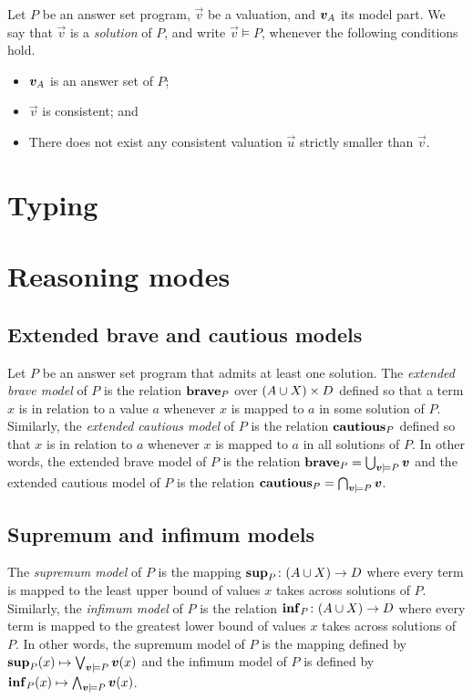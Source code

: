 Let $P$ be an answer set program, $\vec{v}$ be a valuation, and ${\bm{v}}_{A}$ its model part.
We say that $\vec{v}$ is a \emph{solution} of $P$, and write $\vec{v} \models P$, whenever the following conditions hold.

\begin{itemize}
\item ${\bm{v}}_{A}$ is an answer set of $P$;
\item $\vec{v}$ is consistent; and
\item There does not exist any consistent valuation $\vec{u}$ strictly smaller than $\vec{v}$.
\end{itemize}


\section{Typing}
\section{Reasoning modes}
\subsection{Extended brave and cautious models}
Let $P$ be an answer set program that admits at least one solution.
The \emph{extended brave model} of $P$ is the relation $\mathbf{brave}_{P}$ over $(A \cup X) \times D$ defined so that a term $x$ is in relation to a value $a$ whenever $x$ is mapped to $a$ in some solution of $P$.
Similarly, the \emph{extended cautious model} of $P$ is the relation $\mathbf{cautious}_{P}$ defined so that $x$ is in relation to $a$ whenever $x$ is mapped to $a$ in all solutions of $P$.
In other words, the extended brave model of $P$ is the relation $\mathbf{brave}_{P} = \bigcup_{\bm{v}\models P} \bm{v}$ and the extended cautious model of $P$ is the relation $\mathbf{cautious}_{P} = \bigcap_{\bm{v}\models P} \bm{v}$.

\subsection{Supremum and infimum models}
The \emph{supremum model} of $P$ is the mapping $\mathbf{sup}_{P} \colon (A \cup X) \rightarrow D$ where every term is mapped to the least upper bound of values $x$ takes across solutions of $P$.
Similarly, the \emph{infimum model} of $P$ is the relation $\mathbf{inf}_{P} \colon (A \cup X) \rightarrow D$ where every term is mapped to the greatest lower bound of values $x$ takes across solutions of $P$. %
In other words, the supremum model of $P$ is the mapping defined by $\mathbf{sup}_{P}(x) \mapsto \bigvee_{\bm{v}\models P} \bm{v}(x)$ and the infimum model of $P$ is defined by $\mathbf{inf}_{P}(x) \mapsto \bigwedge_{\bm{v}\models P} \bm{v}(x)$.

